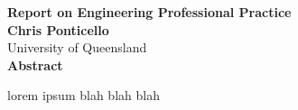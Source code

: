 \begin{center}
	{\Large \bf Report on Engineering Professional Practice} \\
	\vspace{0.4cm}
	{\Large \bf Chris Ponticello} \\
	\vspace{0.4cm}
	{\Large University of Queensland} \\
	\vspace{2.0cm}
	{\Large \bf Abstract} \\
\end{center}

lorem ipsum blah blah blah
